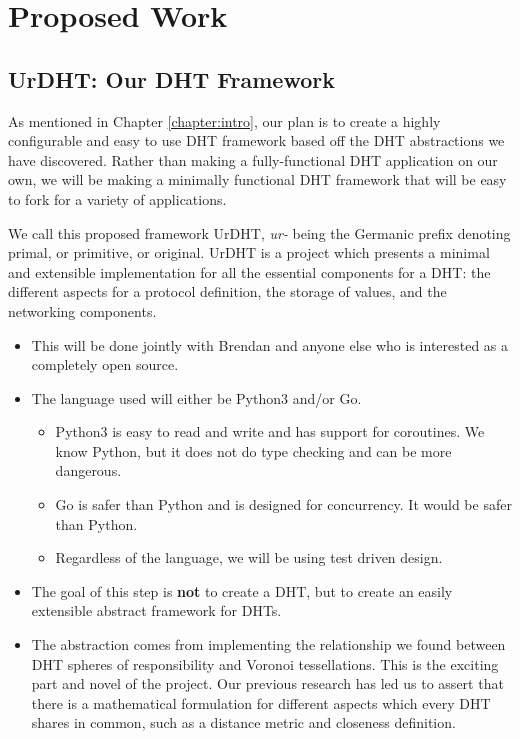 \chapter{Proposed Work}
\label{chapter:experiments}


\section{UrDHT: Our DHT Framework}
As mentioned in Chapter \ref{chapter:intro}, our plan is to create a highly configurable and easy to use DHT framework based off the DHT abstractions we have discovered.
Rather than making a fully-functional DHT application on our own, we will be making a minimally functional DHT framework that will be easy to fork for a variety of applications.

We call this proposed framework UrDHT, \textit{ur-} being the Germanic prefix denoting primal, or primitive, or original.
UrDHT is a project which presents a minimal and extensible implementation for all the essential components for a DHT: the different aspects for a protocol definition, the storage of values, and the networking components.


\begin{itemize}
	\item This will be done jointly with Brendan and anyone else who is interested as a completely open source.
	\item The language used will either be Python3 and/or Go.
	\begin{itemize}
		\item Python3 is easy to read and write and has support for coroutines.  We know Python, but it does not do type checking and can be more dangerous.
		\item Go is safer than Python and is designed for concurrency. It would be safer than Python.
		\item Regardless of the language, we will be using test driven design.
	\end{itemize}
	\item The goal of this step is \textbf{not} to create a DHT, but to create an easily extensible abstract framework for DHTs.
	\item The abstraction comes from implementing the relationship we found between DHT spheres of responsibility and Voronoi tessellations.  
	This is the exciting part and novel of the project.
	Our previous research \cite{vhash} has led us to assert that there is a mathematical formulation for different aspects which every DHT shares in common, such as a distance metric and closeness definition.
	
\end{itemize}

